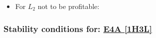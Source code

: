 \begin{itemize}
\begin{itemize}
		\item For $L_2$ not to be profitable:


	\end{itemize}

\end{itemize}



\subsubsection{Stability conditions for: \hyperref[apx:E4A:1H3L]{E4A [1H3L]}}
\label{apx:E4A:1H3L_stability_cond}

